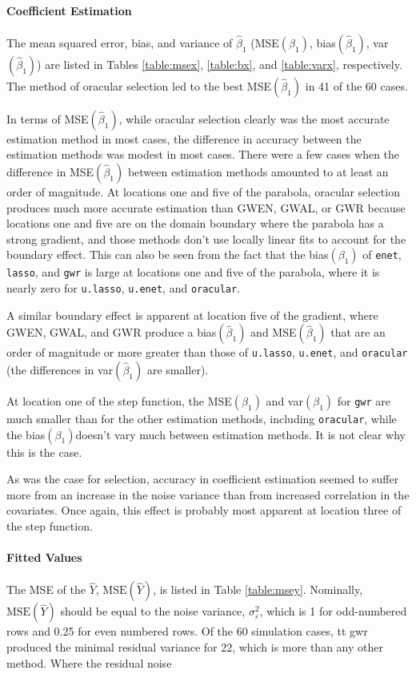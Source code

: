 \documentclass[authoryear, review, 11pt]{elsarticle}
\begin{document}
	\paragraph{Coefficient Estimation} The mean squared error, bias, and variance of $\hat{\beta}_1$ (MSE$(\beta_1)$, bias$(\hat{\beta}_1)$, var$(\hat{\beta}_1)$) are listed in Tables \ref{table:msex}, \ref{table:bx}, and \ref{table:varx}, respectively. The method of oracular selection led to the best MSE$(\hat{\beta}_1)$ in 41 of the 60 cases.
	
	In terms of MSE$(\hat{\beta}_1)$, while oracular selection clearly was the most accurate estimation method in most cases, the difference in accuracy between the estimation methods was modest in most cases. There were a few cases when the difference in MSE$(\hat{\beta}_1)$ between estimation methods amounted to at least an order of magnitude. At locations one and five of the parabola, oracular selection produces much more accurate estimation than GWEN, GWAL, or GWR because locations one and five are on the domain boundary where the parabola has a strong gradient, and those methods don't use locally linear fits to account for the boundary effect. This can also be seen from the fact that the bias$(\beta_1)$ of {\tt enet}, {\tt lasso}, and {\tt gwr} is large at locations one and five of the parabola, where it is nearly zero for {\tt u.lasso}, {\tt u.enet}, and {\tt oracular}.
	
	A similar boundary effect is apparent at location five of the gradient, where GWEN, GWAL, and GWR produce a bias$(\hat{\beta}_1)$ and MSE$(\hat{\beta}_1)$ that are an order of magnitude or more greater than those of {\tt u.lasso}, {\tt u.enet}, and {\tt oracular} (the differences in var$(\hat{\beta}_1)$ are smaller).
	
	At location one of the step function, the MSE$(\beta_1)$ and var$(\beta_1)$ for {\tt gwr} are much smaller than for the other estimation methods, including {\tt oracular}, while the bias$(\beta_1)$doesn't vary much between estimation methods. It is not clear why this is the case.
		
	As was the case for selection, accuracy in coefficient estimation seemed to suffer more from an increase in the noise variance than from increased correlation in the covariates. Once again, this effect is probably most apparent at location three of the step function.
	
	
	
	\paragraph{Fitted Values} The MSE of the $\hat{Y}$, $\text{MSE}\left(\hat{Y}\right)$, is listed in Table \ref{table:msey}. Nominally, $\text{MSE}\left(\hat{Y}\right)$ should be equal to the noise variance, $\sigma_{\varepsilon}^2$, which is 1 for odd-numbered rows and 0.25 for even numbered rows. Of the 60 simulation cases, {tt gwr} produced the minimal residual variance for 22, which is more than any other method. Where the residual noise 
	
\end{document}
